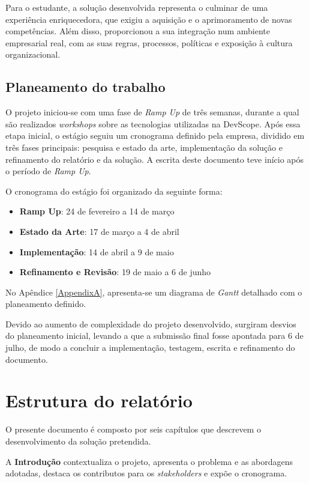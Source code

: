 Para o estudante, a solução desenvolvida representa o culminar de uma experiência enriquecedora, que exigiu a aquisição e o aprimoramento de novas competências. Além disso, proporcionou a sua integração num ambiente empresarial real, com as suas regras, processos, políticas e exposição à cultura organizacional.

\subsection{Planeamento do trabalho}

O projeto iniciou-se com uma fase de \textit{Ramp Up} de três semanas, durante a qual são realizados \textit{workshops} sobre as tecnologias utilizadas na DevScope. Após essa etapa inicial, o estágio seguiu um cronograma definido pela empresa, dividido em três fases principais: pesquisa e estado da arte, implementação da solução e refinamento do relatório e da solução. A escrita deste documento teve início após o período de \textit{Ramp Up}.

O cronograma do estágio foi organizado da seguinte forma:

\begin{itemize}
    \item \textbf{Ramp Up}: 24 de fevereiro a 14 de março
    \item \textbf{Estado da Arte}: 17 de março a 4 de abril
    \item \textbf{Implementação}: 14 de abril a 9 de maio
    \item \textbf{Refinamento e Revisão}: 19 de maio a 6 de junho
\end{itemize}

No Apêndice \ref{AppendixA}, apresenta-se um diagrama de \textit{Gantt} detalhado com o planeamento definido.

Devido ao aumento de complexidade do projeto desenvolvido, surgiram desvios do planeamento inicial, levando a que a submissão final fosse apontada para 6 de julho, de modo a concluir a implementação, testagem, escrita e refinamento do documento.

\section{Estrutura do relatório}

O presente documento é composto por seis capítulos que descrevem o desenvolvimento da solução pretendida.

A \textbf{Introdução} contextualiza o projeto, apresenta o problema e as abordagens adotadas, destaca os contributos para os \textit{stakeholders} e expõe o cronograma.


